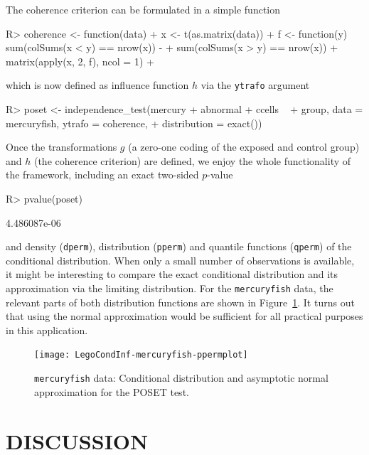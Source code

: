 \documentclass{article}
\newcommand{\Robject}[1]{\texttt{#1}}
\newcommand{\Rcmd}[1]{\texttt{#1}}
\newenvironment{Schunk}{}{}
\begin{document}
The coherence criterion can be formulated in a simple function
\begin{Schunk}
\begin{Sinput}
R> coherence <- function(data) {
+     x <- t(as.matrix(data))
+     f <- function(y) sum(colSums(x < y) == nrow(x)) - 
+         sum(colSums(x > y) == nrow(x))
+     matrix(apply(x, 2, f), ncol = 1)
+ }
\end{Sinput}
\end{Schunk}
which is now defined as influence function $h$ via the \Rcmd{ytrafo} argument
\begin{Schunk}
\begin{Sinput}
R> poset <- independence_test(mercury + abnormal + ccells ~ 
+     group, data = mercuryfish, ytrafo = coherence, 
+     distribution = exact())
\end{Sinput}
\end{Schunk}
Once the transformations $g$ (a zero-one coding of the exposed and control
group) and $h$ (the coherence criterion) are defined, we enjoy the whole
functionality of the framework, including an exact two-sided $p$-value
\begin{Schunk}
\begin{Sinput}
R> pvalue(poset)
\end{Sinput}
\begin{Soutput}
[1] 4.486087e-06
\end{Soutput}
\end{Schunk}
and density (\Rcmd{dperm}), distribution (\Rcmd{pperm}) and quantile functions 
(\Rcmd{qperm}) of the conditional distribution. When only a small number of
observations is available, it might be interesting to compare the exact
conditional distribution and its approximation via the limiting distribution.
For the \Robject{mercuryfish} data, the relevant parts of 
both distribution functions are shown in Figure~\ref{distplot}. It 
turns out that using the normal approximation would be sufficient for all practical
purposes in this application.

\begin{figure}
\begin{center}
\texttt{[image: LegoCondInf-mercuryfish-ppermplot]}
\caption{\Robject{mercuryfish} data: 
         Conditional distribution and asymptotic normal approximation 
         for the POSET test. \label{distplot}}
\end{center}
\end{figure}

\section{DISCUSSION}
\end{document}
